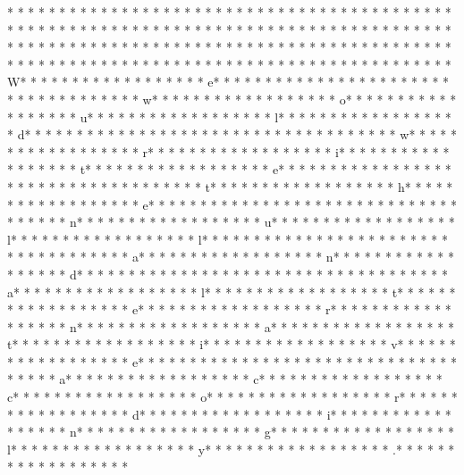 * * *  * * *  * * *  *  * * *  *  * * *  * * *  * * *  *  * * *  *  * * *  * * *  * * *  *  * * *  *  * * *  *  * * *  * * *  * * *  *  * * *  *  * * *  *  * * *  * * *  * * *  *  * * *  *  * * *  *  * * *  * * *  * * *  *  * * *  *  * * *  *  * * *  * * *  * * *  *  * * *  *  * * *  *  * * *  * * *  * * *  *  * * *  *  * * *  *  * * *  * * *  * * *  *  * * *  *  * * *  *  * * *  * * *  * * *  *  * * *  *  * * *  * W* * *  * * *  * * *  *  * * *  *  * * *  * e* * *  * * *  * * *  *  * * *  *  * * *  *  * * *  * * *  * * *  *  * * *  *  * * *  * w* * *  * * *  * * *  *  * * *  *  * * *  * o* * *  * * *  * * *  *  * * *  *  * * *  * u* * *  * * *  * * *  *  * * *  *  * * *  * l* * *  * * *  * * *  *  * * *  *  * * *  * d* * *  * * *  * * *  *  * * *  *  * * *  *  * * *  * * *  * * *  *  * * *  *  * * *  * w* * *  * * *  * * *  *  * * *  *  * * *  * r* * *  * * *  * * *  *  * * *  *  * * *  * i* * *  * * *  * * *  *  * * *  *  * * *  * t* * *  * * *  * * *  *  * * *  *  * * *  * e* * *  * * *  * * *  *  * * *  *  * * *  *  * * *  * * *  * * *  *  * * *  *  * * *  * t* * *  * * *  * * *  *  * * *  *  * * *  * h* * *  * * *  * * *  *  * * *  *  * * *  * e* * *  * * *  * * *  *  * * *  *  * * *  *  * * *  * * *  * * *  *  * * *  *  * * *  * n* * *  * * *  * * *  *  * * *  *  * * *  * u* * *  * * *  * * *  *  * * *  *  * * *  * l* * *  * * *  * * *  *  * * *  *  * * *  * l* * *  * * *  * * *  *  * * *  *  * * *  *  * * *  * * *  * * *  *  * * *  *  * * *  * a* * *  * * *  * * *  *  * * *  *  * * *  * n* * *  * * *  * * *  *  * * *  *  * * *  * d* * *  * * *  * * *  *  * * *  *  * * *  *  * * *  * * *  * * *  *  * * *  *  * * *  * a* * *  * * *  * * *  *  * * *  *  * * *  * l* * *  * * *  * * *  *  * * *  *  * * *  * t* * *  * * *  * * *  *  * * *  *  * * *  * e* * *  * * *  * * *  *  * * *  *  * * *  * r* * *  * * *  * * *  *  * * *  *  * * *  * n* * *  * * *  * * *  *  * * *  *  * * *  * a* * *  * * *  * * *  *  * * *  *  * * *  * t* * *  * * *  * * *  *  * * *  *  * * *  * i* * *  * * *  * * *  *  * * *  *  * * *  * v* * *  * * *  * * *  *  * * *  *  * * *  * e* * *  * * *  * * *  *  * * *  *  * * *  *  * * *  * * *  * * *  *  * * *  *  * * *  * a* * *  * * *  * * *  *  * * *  *  * * *  * c* * *  * * *  * * *  *  * * *  *  * * *  * c* * *  * * *  * * *  *  * * *  *  * * *  * o* * *  * * *  * * *  *  * * *  *  * * *  * r* * *  * * *  * * *  *  * * *  *  * * *  * d* * *  * * *  * * *  *  * * *  *  * * *  * i* * *  * * *  * * *  *  * * *  *  * * *  * n* * *  * * *  * * *  *  * * *  *  * * *  * g* * *  * * *  * * *  *  * * *  *  * * *  * l* * *  * * *  * * *  *  * * *  *  * * *  * y* * *  * * *  * * *  *  * * *  *  * * *  * .* * *  * * *  * * *  *  * * *  *  * * *  * 
